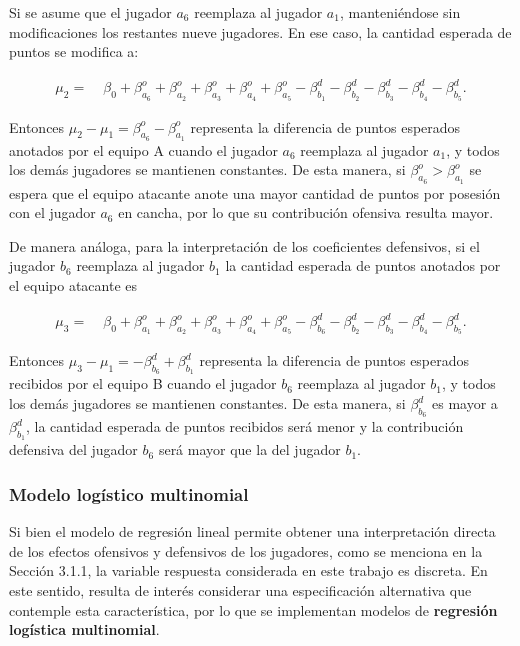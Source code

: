 \documentclass[
  12pt,
]{article}
\begin{document}
Si se asume que el jugador \(a_6\) reemplaza al jugador \(a_1\),
manteniéndose sin modificaciones los restantes nueve jugadores. En ese
caso, la cantidad esperada de puntos se modifica a:

\[
\begin{aligned}
\mu_2 =\;&
\beta_0
+\beta_{a_6}^{o}
+\beta_{a_2}^{o}
+\beta_{a_3}^{o}
+\beta_{a_4}^{o}
+\beta_{a_5}^{o}
-\beta_{b_1}^{d}
-\beta_{b_2}^{d}
-\beta_{b_3}^{d}
-\beta_{b_4}^{d}
-\beta_{b_5}^{d}.
\end{aligned}
\]

Entonces \(\mu_2-\mu_1= \beta_{a_6}^{o}-\beta_{a_1}^{o}\) representa la
diferencia de puntos esperados anotados por el equipo A cuando el
jugador \(a_6\) reemplaza al jugador \(a_1\), y todos los demás
jugadores se mantienen constantes. De esta manera, si
\(\beta_{a_6}^{o} > \beta_{a_1}^{o}\) se espera que el equipo atacante
anote una mayor cantidad de puntos por posesión con el jugador \(a_6\)
en cancha, por lo que su contribución ofensiva resulta mayor.

De manera análoga, para la interpretación de los coeficientes
defensivos, si el jugador \(b_6\) reemplaza al jugador \(b_1\) la
cantidad esperada de puntos anotados por el equipo atacante es

\[
\begin{aligned}
\mu_3 =\;&
\beta_0
+\beta_{a_1}^{o}
+\beta_{a_2}^{o}
+\beta_{a_3}^{o}
+\beta_{a_4}^{o}
+\beta_{a_5}^{o}
-\beta_{b_6}^{d}
-\beta_{b_2}^{d}
-\beta_{b_3}^{d}
-\beta_{b_4}^{d}
-\beta_{b_5}^{d}.
\end{aligned}
\]

Entonces \(\mu_3-\mu_1= -\beta_{b_6}^{d}+\beta_{b_1}^{d}\) representa la
diferencia de puntos esperados recibidos por el equipo B cuando el
jugador \(b_6\) reemplaza al jugador \(b_1\), y todos los demás
jugadores se mantienen constantes. De esta manera, si
\(\beta_{b_6}^{d}\) es mayor a \(\beta_{b_1}^{d}\), la cantidad esperada
de puntos recibidos será menor y la contribución defensiva del jugador
\(b_6\) será mayor que la del jugador \(b_1\).

\subsubsection{Modelo logístico
multinomial}\label{modelo-loguxedstico-multinomial}

Si bien el modelo de regresión lineal permite obtener una interpretación
directa de los efectos ofensivos y defensivos de los jugadores, como se
menciona en la Sección 3.1.1, la variable respuesta considerada en este
trabajo es discreta. En este sentido, resulta de interés considerar una
especificación alternativa que contemple esta característica, por lo que
se implementan modelos de \textbf{regresión logística multinomial}.
\end{document}
